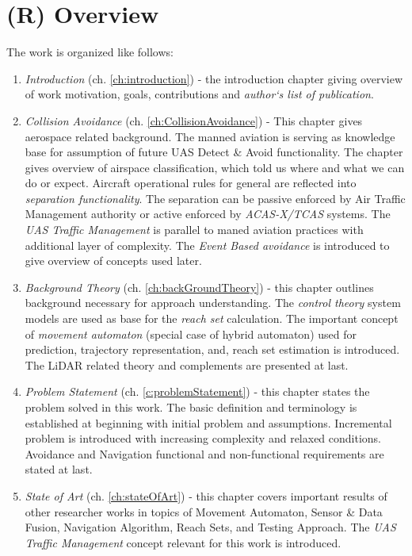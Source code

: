 \section{(R) Overview}\label{s:Overview}

\noindent The work is organized like follows:

\begin{enumerate}
    \item \emph{Introduction} (ch. \ref{ch:introduction}) - the introduction chapter giving overview of work motivation, goals, contributions and \emph{author`s list of publication}.
    
    \item \emph{Collision Avoidance} (ch. \ref{ch:CollisionAvoidance}) - This chapter gives aerospace related background. The manned aviation is serving as knowledge base for assumption of future UAS Detect \& Avoid functionality. The chapter gives overview of airspace classification, which told us where and what we can do or expect. Aircraft operational rules for general are reflected into \emph{separation functionality}. The separation can be passive enforced by Air Traffic Management authority or active enforced by \emph{ACAS-X/TCAS} systems. The \emph{UAS Traffic Management} is parallel to maned aviation practices with additional layer of complexity.  The \emph{Event Based avoidance} is introduced to give overview of concepts used later.
    
    \item \emph{Background Theory} (ch. \ref{ch:backGroundTheory}) - this chapter outlines background necessary for approach understanding. The \emph{control theory} system models are used as base for the \emph{reach set} calculation. The important concept of \emph{movement automaton} (special case of hybrid automaton) used for prediction, trajectory representation, and, reach set estimation is introduced. The LiDAR related theory and complements are presented at last. 
    
    \item \emph{Problem Statement} (ch. \ref{c:problemStatement}) - this chapter states the problem solved in this work. The basic definition and terminology is established at beginning with initial problem and assumptions. Incremental problem is introduced with increasing complexity and relaxed conditions. Avoidance and Navigation functional and non-functional requirements are stated at last. 
    
    \item \emph{State of Art} (ch. \ref{ch:stateOfArt}) - this chapter covers important results of other researcher works in topics of Movement Automaton, Sensor \& Data Fusion, Navigation Algorithm, Reach Sets, and Testing Approach. The \emph{UAS Traffic Management} concept relevant for this work is introduced.  
    

\end{enumerate}

